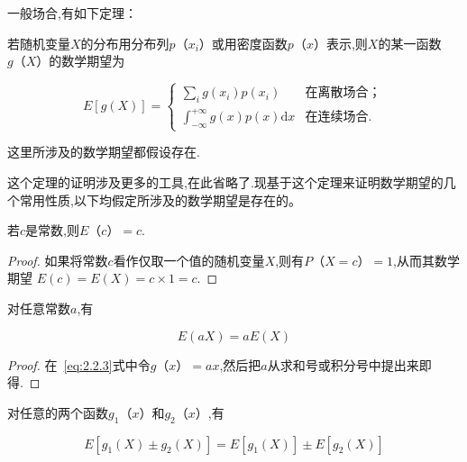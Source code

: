 一般场合,有如下定理：
\begin{theorem}{}{}
	若随机变量$ X $的分布用分布列$ p（x_i） $或用密度函数$ p（x） $表示,则$ X $的某一函数$ g（X） $的数学期望为
	
	\begin{equation}
	E[g(X)]=\left\{\begin{array}{ll}
	{\sum_{i} g\left(x_{i}\right) p\left(x_{i}\right)}&{\text{在离散场合；}} \\ {\int_{-\infty}^{+\infty} g(x) p(x) \mathrm{d} x} &{\text{在连续场合.}} 
	\end{array}\right. \label{eq:2.2.3}
	\end{equation}
	
	这里所涉及的数学期望都假设存在.
	
	这个定理的证明涉及更多的工具,在此省略了.现基于这个定理来证明数学期望的几个常用性质,以下均假定所涉及的数学期望是存在的。
	
\end{theorem}

\begin{property}
	
	若$ c $是常数,则$ E（c）=c $.
	
\end{property}

\begin{proof}
	如果将常数$ c $看作仅取一个值的随机变量$ X $,则有$ P（X=c）=1 $,从而其数学期望 $ E(c)=E(X)=c \times 1=c $.
\end{proof}

\begin{property}
	对任意常数$ a $,有
	
	\begin{equation}
	E ( a X ) = a E ( X ) \label{eq:2.2.4}
	\end{equation}
	
\end{property}

\begin{proof}
	在~\ref{eq:2.2.3}式中令$ g（x）=ax $,然后把$ a $从求和号或积分号中提出来即得.
\end{proof}

\begin{property}
	对任意的两个函数$ g_1（x） $和$ g_2（x） $,有
	
	\begin{equation}
	E \left[ g _ { 1 } ( X ) \pm g _ { 2 } ( X ) \right] = E \left[ g _ { 1 } ( X ) \right] \pm E \left[ g _ { 2 } ( X ) \right] \label{eq:2.2.5}
	\end{equation}
	
\end{property}

